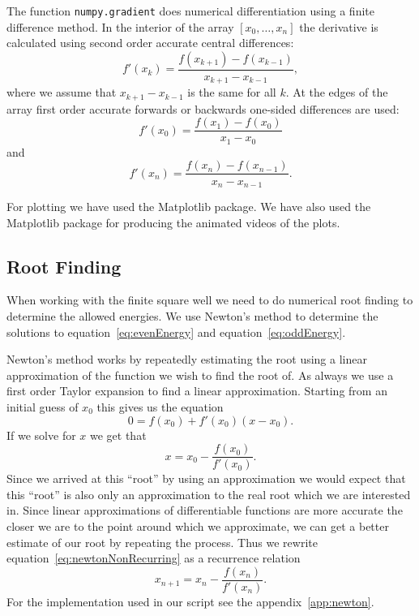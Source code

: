 \documentclass[12pt,a4paper]{article}
\begin{document}
The function \lstinline{numpy.gradient} does numerical differentiation using a finite difference method. In the interior of the array $[x_0, \ldots, x_n]$ the derivative is calculated using second order accurate central differences:
\begin{equation}
f'(x_k) = \frac{f(x_{k + 1}) - f(x_{k - 1})}{x_{k + 1} - x_{k - 1}},
\end{equation}
where we assume that $x_{k + 1} - x_{k - 1}$ is the same for all $k$. At the edges of the array first order accurate forwards or backwards one-sided differences are used:
\begin{equation}
f'(x_0) = \frac{f(x_1) - f(x_0)}{x_1 - x_0}
\end{equation}
and
\begin{equation}
f'(x_n) = \frac{f(x_n) - f(x_{n - 1})}{x_n - x_{n - 1}}.
\end{equation}

For plotting we have used the Matplotlib package. We have also used the Matplotlib package for producing the animated videos of the plots.

\subsection{Root Finding}
When working with the finite square well we need to do numerical root finding to determine the allowed energies. We use Newton's method to determine the solutions to equation~\eqref{eq:evenEnergy} and equation~\eqref{eq:oddEnergy}.

Newton's method works by repeatedly estimating the root using a linear approximation of the function we wish to find the root of. As always we use a first order Taylor expansion to find a linear approximation. Starting from an initial guess of $x_0$ this gives us the equation
\begin{equation}
0 = f(x_0) + f'(x_0)(x - x_0).
\end{equation}
If we solve for $x$ we get that
\begin{equation}
x = x_0 - \frac{f(x_0)}{f'(x_0)}. \label{eq:newtonNonRecurring}
\end{equation}
Since we arrived at this ``root'' by using an approximation we would expect that this ``root'' is also only an approximation to the real root which we are interested in. Since linear approximations of differentiable functions are more accurate the closer we are to the point around which we approximate, we can get a better estimate of our root by repeating the process. Thus we rewrite equation~\eqref{eq:newtonNonRecurring} as a recurrence relation
\begin{equation}
x_{n+1} = x_n - \frac{f(x_n)}{f'(x_n)}.
\end{equation}
For the implementation used in our script see the appendix~\ref{app:newton}.
\end{document}
